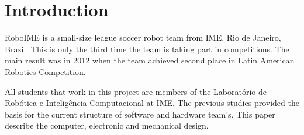 \section{Introduction}
    RoboIME is a small-size league soccer robot team from IME, Rio de Janeiro, Brazil. This
is only the third time the team is taking part in competitions. The main result was in 2012
when the team achieved second place in Latin American Robotics Competition.

All students that work in this project are members of the Laboratório de Robótica e
Inteligência Computacional at IME. The previous studies \cite{alexandre}\cite{marco} provided
the basis for the current structure of software and hardware team's. This paper describe the
computer, electronic and mechanical design.
